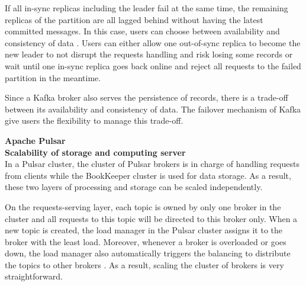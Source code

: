 If all in-sync replicas including the leader fail at the same time, the remaining replicas of the partition are all lagged behind without having the latest committed messages. In this case, users can choose between availability and consistency of data \cite{kafkadatareplication}. Users can either allow one out-of-sync replica to become the new leader to not disrupt the requests handling and risk losing some records or wait until one in-sync replica goes back online and reject all requests to the failed partition in the meantime. 

Since a Kafka broker also serves the persistence of records, there is a trade-off between its availability and consistency of data. The failover mechanism of Kafka give users the flexibility to manage this trade-off.

\large \textbf{Apache Pulsar}\\
\normalsize
\textbf{Scalability of storage and computing server}\\
In a Pulsar cluster, the cluster of Pulsar brokers is in charge of handling requests from clients while the BookKeeper cluster is used for data storage. As a result, these two layers of processing and storage can be scaled independently.

On the requests-serving layer, each topic is owned by only one broker in the cluster and all requests to this topic will be directed to this broker only. When a new topic is created, the load manager in the Pulsar cluster assigns it to the broker with the least load. Moreover, whenever a broker is overloaded or goes down, the load manager also automatically triggers the balancing to distribute the topics to other brokers \cite{pulsarloadbalance}. As a result, scaling the cluster of brokers is very straightforward. 

